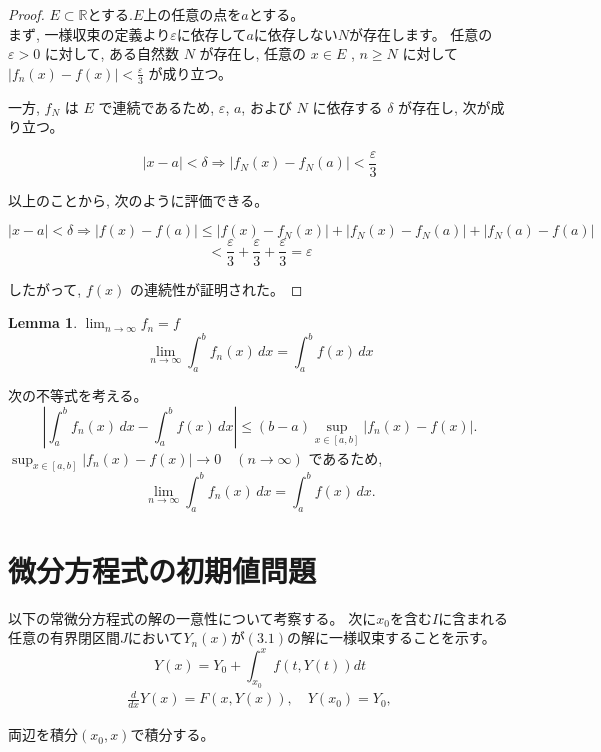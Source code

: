 \documentclass[a4paper]{article}
\newtheorem{Lemma}{Lemma}       %
\begin{document}
\begin{proof}
    $E\subset \mathbb{R}$とする.$E$上の任意の点を$a$とする。\\
    まず, 一様収束の定義より$\varepsilon$に依存して$a$に依存しない$N$が存在します。
    任意の $\varepsilon > 0$ に対して, ある自然数 $N$ が存在し, 任意の $x \in E$ , $n \geq N$ に対して $\left| f_n(x) - f(x) \right| < \frac{\varepsilon}{3}$ が成り立つ。

    一方, $f_N$ は $E$ で連続であるため, $\varepsilon$, $a$, および $N$ に依存する $\delta$ が存在し, 次が成り立つ。

    \[
    \left| x - a \right| < \delta \Rightarrow \left| f_N(x) - f_N(a) \right| < \frac{\varepsilon}{3}
    \]

    以上のことから, 次のように評価できる。

    \[
    \left| x - a \right| < \delta \Rightarrow \left| f(x) - f(a) \right| \leq \left| f(x) - f_N(x) \right| + \left| f_N(x) - f_N(a) \right| + \left| f_N(a) - f(a) \right|
    \]
    \[
    < \frac{\varepsilon}{3} + \frac{\varepsilon}{3} + \frac{\varepsilon}{3} = \varepsilon
    \]

    したがって, $f(x)$ の連続性が証明された。
\end{proof}

\begin{Lemma}
    $\lim_{n \to \infty} f_n = f$\[\lim_{n \to \infty} \displaystyle \int_a^b f_n(x) \, dx = \displaystyle \int_a^b f(x) \, dx \]
\end{Lemma}

次の不等式を考える。
\[
\left| \int_a^b f_n(x) \, dx - \int_a^b f(x) \, dx \right| \leq (b-a) \sup_{x \in [a, b]} |f_n(x) - f(x)|.
\]
\(\sup_{x \in [a, b]} |f_n(x) - f(x)| \to 0 \quad (n \to \infty)\) であるため,
\[
\lim_{n \to \infty} \int_a^b f_n(x) \, dx = \int_a^b f(x) \, dx.
\]

\section{微分方程式の初期値問題}
\label{sec:微分方程式の初期値問題}
    以下の常微分方程式の解の一意性について考察する。
    次に$x_{0}$を含む$I$に含まれる任意の有界閉区間$J$において$Y_{n}(x)$が$(3.1)$の解に一様収束することを示す。
    \[Y(x)=Y_{0}+\displaystyle \int_{x_{0}}^{x} f(t,Y(t)) dt\]
    \begin{align}
        \frac{d}{dx}Y(x) = F(x, Y(x)), \quad Y(x_{0}) = Y_{0},
    \end{align}

    両辺を積分$(x_{0},x)$で積分する。
\end{document}
